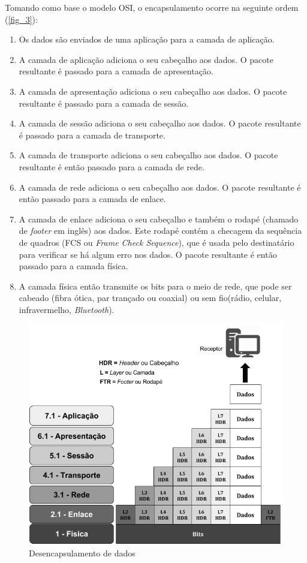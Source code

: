 \documentclass[
12pt,				%
openright,			%
oneside,			%
a4paper,			%
brazil,				%
]{abntex2}
\begin{document}
	\par Tomando como base o modelo OSI, o encapsulamento ocorre na seguinte ordem (\autoref{fig_3}):
	
	\begin{enumerate}
		\item Os dados são enviados de uma aplicação para a camada de aplicação.
		\item A camada de aplicação adiciona o seu cabeçalho aos dados. O pacote resultante é passado para a camada de apresentação.
		\item A camada de apresentação adiciona o seu cabeçalho aos dados. O pacote resultante é passado para a camada de sessão.
		\item A camada de sessão adiciona o seu cabeçalho aos dados. O pacote resultante é passado para a camada de transporte.
		\item A camada de transporte adiciona o seu cabeçalho aos dados. O pacote resultante é então passado para a camada de rede.
		\item A camada de rede adiciona o seu cabeçalho aos dados. O pacote resultante é então passado para a camada de enlace.
		\item A camada de enlace adiciona o seu cabeçalho e também o rodapé (chamado de \textit{footer} em inglês) aos dados. Este rodapé contém a checagem da sequência de quadros (FCS ou \textit{Frame Check Sequence}), que é usada pelo destinatário para verificar se há algum erro nos dados. O pacote resultante é então passado para a camada física.
		\item A camada física então transmite os bits para o meio de rede, que pode ser cabeado (fibra ótica, par trançado ou coaxial) ou sem fio(rádio, celular, infravermelho, \textit{Bluetooth}).
	\end{enumerate}

	\begin{figure} [H]
		\centering
		\includegraphics[scale=.5]{figuras/cap2/04DesencapsulamentoDedados}
		\caption{\label{fig_4}Desencapsulamento de dados}
	\end{figure}
	
\end{document}
